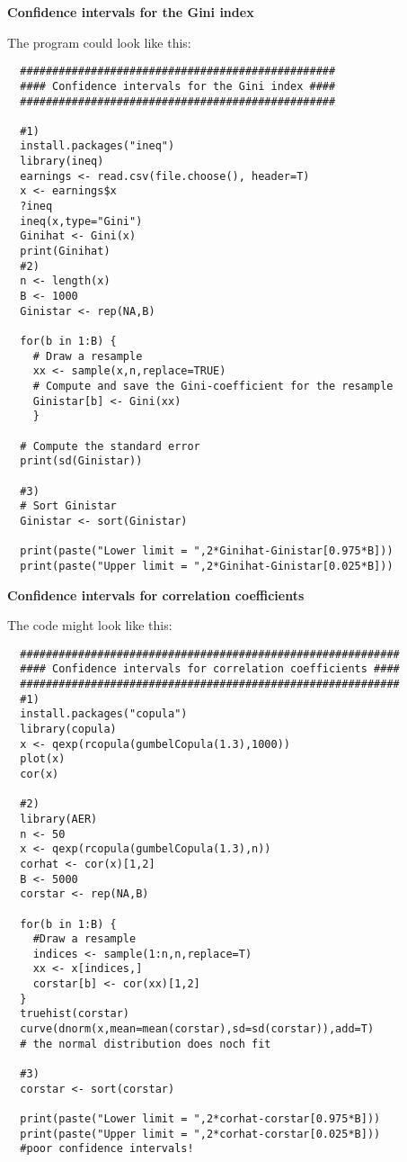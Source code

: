 \begin{Solution}{16.2}
\textbf{Confidence intervals for the Gini index}

The program could look like this:
\begin{verbatim}
  #################################################
  #### Confidence intervals for the Gini index ####
  #################################################

  #1)
  install.packages("ineq")
  library(ineq)
  earnings <- read.csv(file.choose(), header=T)
  x <- earnings$x
  ?ineq
  ineq(x,type="Gini")
  Ginihat <- Gini(x)
  print(Ginihat)
  #2)
  n <- length(x)
  B <- 1000
  Ginistar <- rep(NA,B)

  for(b in 1:B) {
    # Draw a resample
    xx <- sample(x,n,replace=TRUE)
    # Compute and save the Gini-coefficient for the resample
    Ginistar[b] <- Gini(xx)
    }

  # Compute the standard error
  print(sd(Ginistar))

  #3)
  # Sort Ginistar
  Ginistar <- sort(Ginistar)

  print(paste("Lower limit = ",2*Ginihat-Ginistar[0.975*B]))
  print(paste("Upper limit = ",2*Ginihat-Ginistar[0.025*B]))
\end{verbatim}
\end{Solution}
\begin{Solution}{16.3}
\textbf{Confidence intervals for correlation coefficients }

The code might look like this:
\begin{verbatim}
  ###########################################################
  #### Confidence intervals for correlation coefficients ####
  ###########################################################
  #1)
  install.packages("copula")
  library(copula)
  x <- qexp(rcopula(gumbelCopula(1.3),1000))
  plot(x)
  cor(x)

  #2)
  library(AER)
  n <- 50
  x <- qexp(rcopula(gumbelCopula(1.3),n))
  corhat <- cor(x)[1,2]
  B <- 5000
  corstar <- rep(NA,B)

  for(b in 1:B) {
    #Draw a resample
    indices <- sample(1:n,n,replace=T)
    xx <- x[indices,]
    corstar[b] <- cor(xx)[1,2]
  }
  truehist(corstar)
  curve(dnorm(x,mean=mean(corstar),sd=sd(corstar)),add=T)
  # the normal distribution does noch fit

  #3)
  corstar <- sort(corstar)

  print(paste("Lower limit = ",2*corhat-corstar[0.975*B]))
  print(paste("Upper limit = ",2*corhat-corstar[0.025*B]))
  #poor confidence intervals!
\end{verbatim}
\end{Solution}

